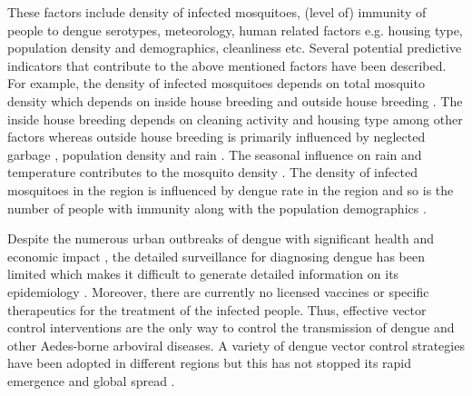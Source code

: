 \documentclass{bmcart}
\begin{document}
These factors include density of infected mosquitoes, (level of) immunity of people to dengue serotypes, meteorology, human related factors e.g. housing type, population density and demographics, cleanliness etc. Several potential predictive indicators that contribute to the above mentioned factors have been described\cite{leitmeyer1999dengue,runge2008does,thammapalo2008environmental,sarfraz2014near}. For example, the density of infected mosquitoes depends on total mosquito density \cite{scott2003aedes,alto2008larval} which depends on inside house breeding \cite{syarifah2008ovitrap} and outside house breeding \cite{sarfraz2014near}. The inside house breeding depends on cleaning activity \cite{chareonviriyaphap2003larval,raju2008application} and housing type \cite{favier2005influence} among other factors whereas outside house breeding is primarily influenced by neglected garbage \cite{arunachalam2010eco}, population density \cite{chang2009combining,knudsen1992vector,troyo2009urban} and rain \cite{nakhapakorn2005information}. The seasonal influence on rain \cite{WPR2015,stoddard2014long} and temperature \cite{lambrechts2011impact,carrington2013reduction,stoddard2014long} contributes to the mosquito density \cite{lambrechts2011impact,sulaiman1996relationship,thammapalo2008environmental,sarfraz2014near,nakhapakorn2005information}. The density of infected mosquitoes in the region is influenced by dengue rate in the region  \cite{halstead2008dengue,esteva2000influence} and so is the number of people with immunity \cite{adams2006cross,alto2008larval} along with the population demographics \cite{cummings2009impact,wilder2012denguetools,whodenvsym2015}. 



Despite the numerous urban outbreaks of dengue with significant health and economic impact \cite{gubler2002epidemic,gubler2004cities,anuradha19981996,vaughn2000invited}, the detailed surveillance for diagnosing dengue has been limited which makes it difficult to generate detailed information on its epidemiology \cite{ooi2009dengue,guzman2004dengue}. Moreover, there are currently no licensed vaccines or specific therapeutics for the treatment of the infected people. Thus, effective vector control interventions are the only way to control the transmission of dengue and other Aedes-borne arboviral diseases. A variety of dengue vector control strategies \cite{wilder2012denguetools} have been adopted in different regions\cite{erlanger2008effect,horstick2010dengue,vanlerberghe2009community,luz2011dengue} but this has not stopped its rapid emergence and global spread \cite{tatem2006global}.
\end{document}
